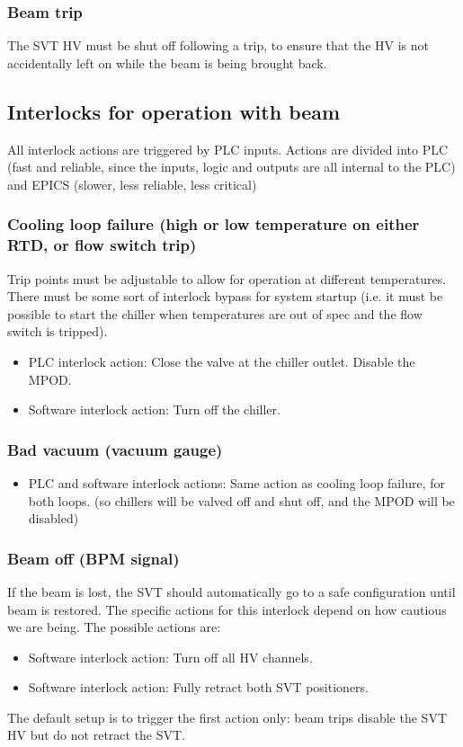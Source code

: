 \documentclass[12pt]{report}
\begin{document}
\subsubsection*{Beam trip}
The SVT HV must be shut off following a trip, to ensure that the HV is not accidentally left on while the beam is being brought back.

\subsection{Interlocks for operation with beam}
All interlock actions are triggered by PLC inputs. Actions are divided into PLC (fast and reliable, since the inputs, logic and outputs are all internal to the PLC) and EPICS (slower, less reliable, less critical)
\subsubsection{Cooling loop failure (high or low temperature on either RTD, or flow switch trip)}
Trip points must be adjustable to allow for operation at different temperatures. There must be some sort of interlock bypass for system startup (i.e. it must be possible to start the chiller when temperatures are out of spec and the flow switch is tripped).
\begin{itemize}
    \item PLC interlock action: Close the valve at the chiller outlet. Disable the MPOD.
    \item Software interlock action: Turn off the chiller.
\end{itemize}

\subsubsection{Bad vacuum (vacuum gauge)}
\begin{itemize}
    \item PLC and software interlock actions: Same action as cooling loop failure, for both loops. (so chillers will be valved off and shut off, and the MPOD will be disabled)
\end{itemize}

\subsubsection{Beam off (BPM signal)}
If the beam is lost, the SVT should automatically go to a safe configuration until beam is restored.
The specific actions for this interlock depend on how cautious we are being.  The possible actions are:
\begin{itemize}
\item Software interlock action: Turn off all HV channels.
\item Software interlock action: Fully retract both SVT positioners.
\end{itemize}
The default setup is to trigger the first action only: beam trips disable the SVT HV but do not retract the SVT.
\end{document}
